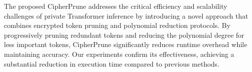 The proposed CipherPrune addresses the critical efficiency and scalability challenges of private Transformer inference by introducing a novel approach that combines encrypted token pruning and polynomial reduction protocols. By progressively pruning redundant tokens and reducing the polynomial degree for less important tokens, CipherPrune significantly reduces runtime overhead while maintaining accuracy. Our experiments confirm its effectiveness, achieving a substantial reduction in execution time compared to previous methods. 